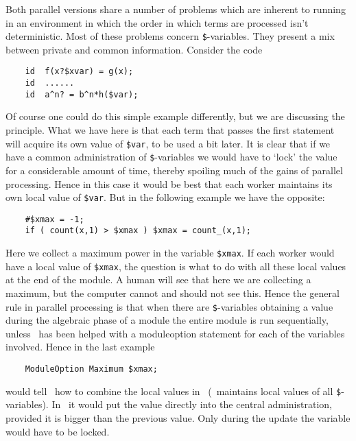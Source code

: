 Both parallel versions share a number of problems which are inherent to 
running in an environment in which the order in which 
terms are processed isn't deterministic. Most of these 
problems concern \verb:$:-variables. They present a mix between private and 
common information. Consider the code
\begin{verbatim}
    id  f(x?$xvar) = g(x);
    id  ......
    id  a^n? = b^n*h($var);
\end{verbatim}
Of course one could do this simple example differently, but we are 
discussing the principle. What we have here is that each term that passes 
the first statement will acquire its own value of \verb:$var:, to be used a 
bit later. It is clear that if we have a common administration of 
\verb:$:-variables we would have to `lock' the value for a 
considerable amount of time, thereby spoiling much of the gains of parallel 
processing. Hence in this case it would be best that each worker maintains 
its own local value of \verb:$var:. But in the following example we have 
the opposite:
\begin{verbatim}
    #$xmax = -1;
    if ( count(x,1) > $xmax ) $xmax = count_(x,1);
\end{verbatim}
Here we collect a maximum power in the variable \verb:$xmax:. If each 
worker would have a local value of \verb:$xmax:, the question is what to do 
with all these local values at the end of the module. A human will see that 
here we are collecting a maximum, but the computer cannot and should not 
see this. Hence the general rule in parallel processing is that when there 
are \verb:$:-variables obtaining a value during the 
algebraic phase of a module the entire module is run sequentially, unless 
\FORM\ has been helped with a moduleoption statement for each of the 
variables involved. Hence in the last example
\begin{verbatim}
    ModuleOption Maximum $xmax;
\end{verbatim}
would tell \FORM\ how to combine the local values in \ParFORM\ (\ParFORM\ 
maintains local values of all \verb:$:-variables). In \TFORM\ it 
would put the value directly into the central administration, provided it 
is bigger than the previous value. Only during the update the variable 
would have to be locked.

